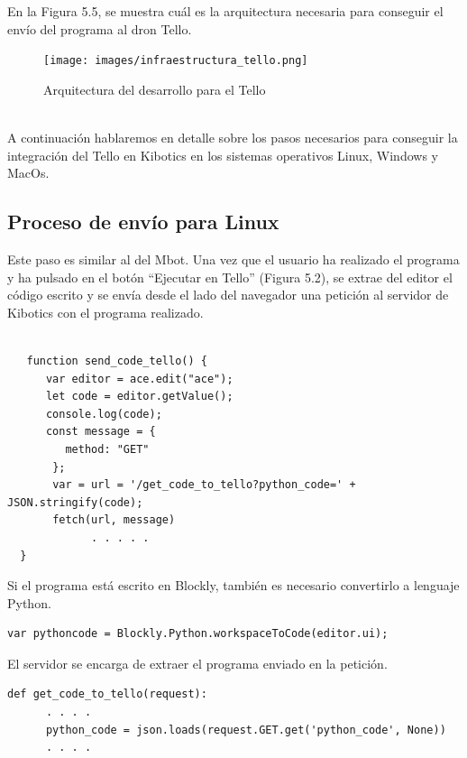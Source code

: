 \documentclass{report}
\begin{document}
En la Figura 5.5, se muestra cuál es la arquitectura necesaria para conseguir el envío del programa al dron Tello.
\\
\begin{figure}[h!]
  \centering
    \texttt{[image: images/infraestructura\_tello.png]}
  \caption{Arquitectura del desarrollo para el Tello}
  \label{Arquitectura del desarrollo para el Tello}
\end{figure}
\\
A continuación hablaremos en detalle sobre los pasos necesarios para conseguir la integración del Tello en Kibotics en los sistemas operativos Linux, Windows y MacOs.

\subsection{Proceso de envío para Linux}

Este paso es similar al del Mbot. Una vez que el usuario ha realizado el programa y ha pulsado en el botón “Ejecutar en Tello” (Figura 5.2), se extrae del editor el código escrito y se envía desde el lado del navegador una petición al servidor de Kibotics con el programa realizado.
\\
\begin{lstlisting}[frame=single,breaklines=true, label="Envio del programa desde el navegador al servidor", caption="Envio del programa desde el navegador al servidor",captionpos=b]
   
   function send_code_tello() {
      var editor = ace.edit("ace");
      let code = editor.getValue();
      console.log(code);
      const message = {
         method: "GET"
       };
       var = url = '/get_code_to_tello?python_code=' + JSON.stringify(code);
       fetch(url, message)
             . . . . .
  }
\end{lstlisting}

Si el programa está escrito en Blockly, también es necesario convertirlo a lenguaje Python.
\\
\begin{lstlisting}[frame=single,breaklines=true, label="Convertir de Blockly a Python", caption="Convertir de Blockly a Python",captionpos=b]
   var pythoncode = Blockly.Python.workspaceToCode(editor.ui);
\end{lstlisting}

El servidor se encarga de extraer el programa enviado en la petición.
\\
\begin{lstlisting}[frame=single,breaklines=true, label="Extraccion del programa en el servidor", caption="Extraccion programa en el servidor", captionpos=b]
   def get_code_to_tello(request):
      . . . .
      python_code = json.loads(request.GET.get('python_code', None))
      . . . .

\end{lstlisting}	
\end{document}
